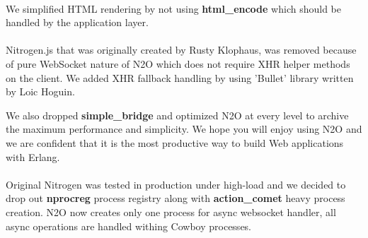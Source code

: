 \paragraph{}
We simplified HTML rendering by not using
{\bf html\_encode} which should be handled by the application layer.

\paragraph{}
Nitrogen.js that was originally created by Rusty Klophaus,
was removed because of pure WebSocket nature of N2O which does not
require XHR helper methods on the client. We added XHR fallback
handling by using 'Bullet' library written by Loic Hoguin.

We also dropped {\bf simple\_bridge} and optimized N2O at every level to
archive the maximum performance and simplicity. We hope you will enjoy
using N2O and we are confident that it is the most productive way to
build Web applications with Erlang.

\paragraph{}
Original Nitrogen was tested in production under high-load and we
decided to drop out {\bf nprocreg} process registry along 
with {\bf{action\_comet}} heavy process creation. N2O now creates
only one process for async websocket handler, all async operations
are handled withing Cowboy processes.
